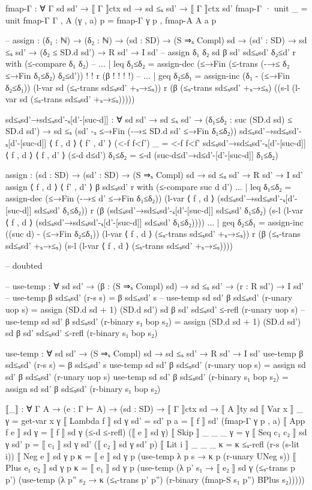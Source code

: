 \documentclass{article}
\begin{document}
\begin{prev}
\begin{code}
fmap-Γ : ∀ {Γ sd sd'} → ⟦ Γ ⟧ctx sd → sd ≤ₛ sd' → ⟦ Γ ⟧ctx sd'
fmap-Γ {·} unit _ = unit
fmap-Γ {Γ , A} (γ , a) p = fmap-Γ γ p , fmap-A {A} a p

-- assign : (δ₁ : ℕ) → (δ₂ : ℕ) → (sd : SD) → (S ⇒ₛ Compl) sd → (sd' : SD) → sd ≤ₛ sd' → (δ₂ ≤ SD.d sd') → R sd' → I sd'
-- assign δ₁ δ₂ sd β sd' sd≤ₛsd' δ₂≤d' r with (≤-compare {δ₁} {δ₂})
-- ... | leq δ₁≤δ₂ = assign-dec (≤→Fin (≤-trans (-→≤ {δ₂} {≤→Fin δ₁≤δ₂}) δ₂≤d')) {!   !} r (β {!   !} {!   !})
-- ... | geq δ₂≤δ₁ = assign-inc (δ₁ - (≤→Fin δ₂≤δ₁)) (l-var sd (≤ₛ-trans sd≤ₛsd' +ₛ→≤ₛ)) r (β (≤ₛ-trans sd≤ₛsd' +ₛ→≤ₛ) ((s-l (l-var sd (≤ₛ-trans sd≤ₛsd' +ₛ→≤ₛ)))))

sd≤ₛsd'→sd≤ₛsd'-ₛ[d'-[suc-d]] : ∀ {sd sd'} → sd ≤ₛ sd' → (δ₁≤δ₂ : suc (SD.d sd) ≤ SD.d sd') → sd ≤ₛ (sd' -ₛ ≤→Fin (-→≤ {SD.d sd'} {≤→Fin δ₁≤δ₂})) 
sd≤ₛsd'→sd≤ₛsd'-ₛ[d'-[suc-d]] {⟨ f , d ⟩} {⟨ f' , d' ⟩} (<-f f<f') _ = <-f f<f'
sd≤ₛsd'→sd≤ₛsd'-ₛ[d'-[suc-d]] {⟨ f , d ⟩} {⟨ f , d' ⟩} (≤-d d≤d') δ₁≤δ₂ = ≤-d (suc-d≤d'→d≤d'-[d'-[suc-d]] δ₁≤δ₂)

assign : (sd : SD) → (sd' : SD) → (S ⇒ₛ Compl) sd → sd ≤ₛ sd' → R sd' → I sd'
assign ⟨ f , d ⟩ ⟨ f' , d' ⟩ β sd≤ₛsd' r with (≤-compare {suc d} {d'})
... | leq δ₁≤δ₂ = assign-dec (≤→Fin (-→≤ {d'} {≤→Fin δ₁≤δ₂})) (l-var ⟨ f , d ⟩ (sd≤ₛsd'→sd≤ₛsd'-ₛ[d'-[suc-d]] sd≤ₛsd' δ₁≤δ₂)) r (β (sd≤ₛsd'→sd≤ₛsd'-ₛ[d'-[suc-d]] sd≤ₛsd' δ₁≤δ₂) (s-l (l-var ⟨ f , d ⟩ (sd≤ₛsd'→sd≤ₛsd'-ₛ[d'-[suc-d]] sd≤ₛsd' δ₁≤δ₂))))
... | geq δ₂≤δ₁ = assign-inc ((suc d) - (≤→Fin δ₂≤δ₁)) (l-var ⟨ f , d ⟩ (≤ₛ-trans sd≤ₛsd' +ₛ→≤ₛ)) r (β (≤ₛ-trans sd≤ₛsd' +ₛ→≤ₛ) (s-l (l-var ⟨ f , d ⟩ (≤ₛ-trans sd≤ₛsd' +ₛ→≤ₛ))))

-- doubted

-- use-temp : ∀ {sd sd'} → (β : (S ⇒ₛ Compl) sd) → sd ≤ₛ sd' → (r : R sd') → I sd'
-- use-temp β sd≤ₛsd' (r-s s) = β sd≤ₛsd' s
-- use-temp {sd} {sd'} β sd≤ₛsd' (r-unary uop s) = assign (SD.d sd + 1) (SD.d sd') sd β sd' sd≤ₛsd' ≤-refl (r-unary uop s)
-- use-temp {sd} {sd'} β sd≤ₛsd' (r-binary s₁ bop s₂) = assign (SD.d sd + 1) (SD.d sd') sd β sd' sd≤ₛsd' ≤-refl (r-binary s₁ bop s₂)

use-temp : ∀ {sd sd'} → (S ⇒ₛ Compl) sd → sd ≤ₛ sd' → R sd' → I sd'
use-temp β sd≤ₛsd' (r-s s) = β sd≤ₛsd' s
use-temp {sd} {sd'} β sd≤ₛsd' (r-unary uop s) = assign sd sd' β sd≤ₛsd' (r-unary uop s)
use-temp {sd} {sd'} β sd≤ₛsd' (r-binary s₁ bop s₂) = assign sd sd' β sd≤ₛsd' (r-binary s₁ bop s₂)


⟦_⟧ : ∀ {Γ A} → (e : Γ ⊢ A) → (sd : SD) → ⟦ Γ ⟧ctx sd → ⟦ A ⟧ty sd
⟦ Var x ⟧ _ γ = get-var x γ
⟦ Lambda f ⟧ sd γ {sd' = sd'} p a = ⟦ f ⟧ sd' (fmap-Γ γ p , a) 
⟦ App f e ⟧ sd γ = ⟦ f ⟧ sd γ (≤-d ≤-refl) (⟦ e ⟧ sd γ)
⟦ Skip ⟧ _ _ _ γ = γ
⟦ Seq c₁ c₂ ⟧ sd γ sd' p = ⟦ c₁ ⟧ sd γ sd' (⟦ c₂ ⟧ sd γ sd' p)
⟦ Lit i ⟧ _ _ _ κ = κ ≤ₛ-refl (r-s (s-lit i))
⟦ Neg e ⟧ sd γ p κ = ⟦ e ⟧ sd γ p (use-temp λ p s → κ p (r-unary UNeg s))    
⟦ Plus e₁ e₂ ⟧ sd γ p κ = ⟦ e₁ ⟧ sd γ p (use-temp (λ p' s₁ → ⟦ e₂ ⟧ sd γ (≤ₛ-trans p p') (use-temp (λ p'' s₂ →  κ (≤ₛ-trans p' p'') (r-binary (fmap-S s₁ p'') BPlus s₂)))))   
\end{code}
\end{prev}
\end{document}

